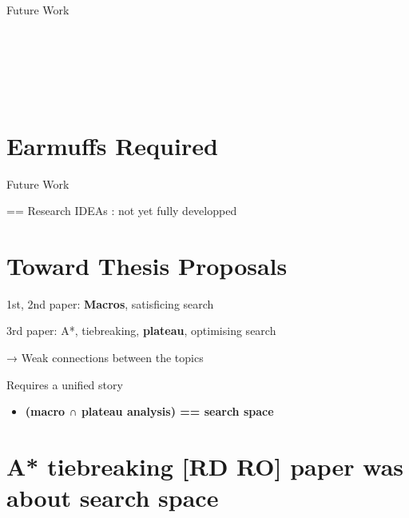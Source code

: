 \begin{xlarge}
\begin{center}
Future Work

　
\end{center}
\end{xlarge}

　

　

\section{Earmuffs Required}
\label{sec-7}

\begin{xlarge}


\begin{center}
Future Work

== Research IDEAs : not yet fully developped
\end{center}
\begin{alignright}

\end{alignright}
\end{xlarge}

\section{Toward Thesis Proposals}
\label{sec-8}

\begin{larger}
1st, 2nd paper: \textbf{Macros}, satisficing search

3rd paper: A*, tiebreaking, \textbf{plateau}, optimising search

\begin{alignright}
→ Weak connections between the topics

Requires a unified story
\end{alignright}

\begin{center}
\begin{itemize}
\item \textbf{(macro ∩ plateau analysis) == search space}
\end{itemize}
\end{center}
\end{larger}


\section{A* tiebreaking [RD RO] paper was about search space}
\label{sec-9}

